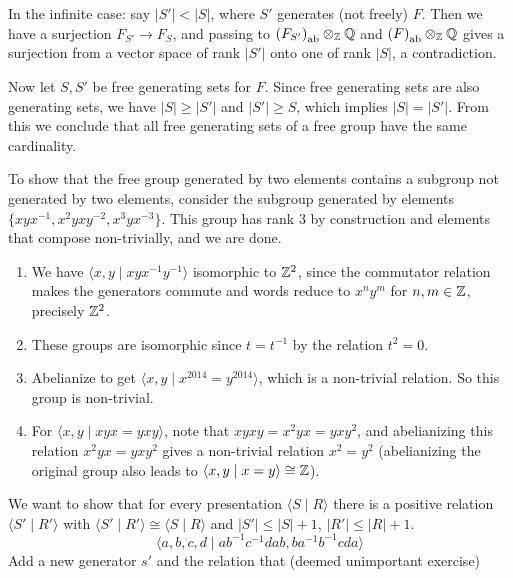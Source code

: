 \begin{ex}
    In the infinite case: say $|S'| < |S|$, where $S'$ generates (not freely) $F$.  Then we have a surjection $F_{S'} \to F_S$, and passing to $\left(F_{S'}\right)_{\mathrm{ab}}\otimes _{\mathbb{Z}}\mathbb{Q}$ and $\left(F\right)_{\mathrm{ab}}\otimes _{\mathbb{Z}}\mathbb{Q}$ gives a surjection from a vector space of rank $|S'|$ onto one of rank $|S|$, a contradiction.
    
    Now let $S,S'$ be free generating sets for $F$. Since free generating sets are also generating sets, we have $|S| \geq |S'|$ and $|S'| \geq S$, which implies $|S|=|S'|$. From this we conclude that all free generating sets of a free group have the same cardinality. 

    To show that the free group generated by two elements contains a subgroup not generated by two elements, consider the subgroup generated by elements $\{xyx ^{-1}, x^2y xy^{-2}, x^3yx ^{-3}\} $. This group has rank 3 by construction and elements that compose non-trivially, and we are done.
\end{ex}
\begin{ex}
    \begin{enumerate}[label=(\arabic*)]
    \setlength\itemsep{-.2em}
        \item We have $\langle x,y\mid  xyx^{-1}y^{-1}\rangle $ isomorphic to $\mathbb{Z}^2$, since the commutator relation makes the generators commute and words reduce to $x^n y^m$ for $n,m \in \mathbb{Z}$, precisely $\mathbb{Z}^2$.
        \item These groups are isomorphic since $t = t^{-1}$ by the relation $t^2=0$.
        \item Abelianize to get $\langle x,y \mid x^{2014}=y ^{2014} \rangle $, which is a non-trivial relation. So this group is non-trivial.
        \item For $\langle x,y \mid xyx=yxy \rangle $, note that $xyxy=x^2yx=yxy^2$, and abelianizing this relation $x^2yx=yxy^2$ gives a non-trivial relation $x^2=y^2$ (abelianizing the original group also leads to $\langle x,y \mid x=y \rangle \cong \mathbb{Z}$).
    \end{enumerate}
\end{ex}
\begin{ex}
    We want to show that for every presentation $\langle S\mid R \rangle $ there is a positive relation $\langle S' \mid R' \rangle $ with $\langle S' \mid R' \rangle \cong  \langle S \mid R \rangle $ and $|S'| \leq |S|+1$, $|R'| \leq |R| +1$.
     \[
         \langle a,b,c,d \mid ab ^{-1} c ^{-1} d ab, b a^{-1} b ^{-1} cda \rangle 
     \] Add a new generator $s'$ and the relation that (deemed unimportant exercise)
\end{ex}
